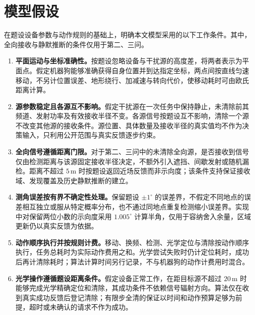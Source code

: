 \section{模型假设}\label{sec:model-assumptions}

在题设设备参数与动作规则的基础上，明确本文模型采用的以下工作条件。其中，全向接收与静默推断的条件仅用于第二、三问。

\begin{enumerate}
  \item \textbf{平面运动与坐标准确性。}按题设忽略设备与干扰源的高度差，将两者表示为平面点。假定机器狗能够准确获得自身位置并到达指定坐标，两点间按直线匀速移动，不另计位置误差、地形绕行、加减速与转向代价，使移动耗时可由欧氏距离计算。

  \item \textbf{源参数稳定且各源互不影响。}假定干扰源在一次任务中保持静止，未清除前其频道、发射功率及有效接收半径不变。各源信号按题设互不影响，清除一个源不改变其他源的接收条件。源位置、具体数量及接收半径的真实值均不作为决策输入，只利用公开范围与真实反馈逐步约束。

  \item \textbf{全向信号遵循距离门限。}对于第二、三问中的未清除全向源，是否接收到信号仅由检测距离与该源固定接收半径决定，不额外引入遮挡、间歇发射或随机漏检。距离不超过 $5\,\mathrm{m}$ 时按题设返回近场反馈而非示向度；该条件支持保证接收域、发现覆盖及历史静默推断的建立。

  \item \textbf{测角误差按有界不确定性处理。}保留题设 $\pm1^\circ$ 的误差界，不假定不同地点的误差相互独立或服从特定概率分布，也不通过同地点重复检测缩小误差界。实现中对保留两位小数的示向度采用 $1.005^\circ$ 计算半角，仅用于容纳舍入余量，区域更新仍以真实反馈为依据。

  \item \textbf{动作顺序执行并按规则计费。}移动、换频、检测、光学定位与清除按动作顺序执行，任务总耗时为实际动作费用之和。光学尝试失败时仍计定位耗时，成功后再计清除耗时；算法计算时间另行记录，不与机器狗的动作计费用时混合。

  \item \textbf{光学操作遵循题设距离条件。}假定设备正常工作，在距目标源不超过 $20\,\mathrm{m}$ 时能够完成光学精确定位和清除，其成功条件不依赖信号辐射方向。算法仅在收到真实成功反馈后登记清除；有限步全清的保证以时间和动作预算足够为前提，超时或未确认的请求不作为成功。
\end{enumerate}

